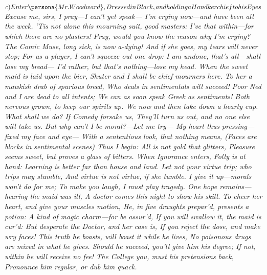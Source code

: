 \documentclass{book}
\begin{document}

\begin{drama}
\begin{versus}
\itshape
\(c)Enter \persona{Mr. Woodward},\\ Dressed in Black, and holding a Handkerchief
to his Eyes\)
\Locus \textus {+4em}
 Excuse me, sirs, I pray---I can't yet speak---
I'm crying now---and have been all the week.
\textup{'Tis not alone this mourning suit,} good masters:
\textup{I've that within}---for which there are no plasters!
Pray, would you know the reason why I'm crying?
The Comic Muse, long sick, is now a-dying!
And if she goes, my tears will never stop;
For as a player, I can't squeeze out one drop:
I am undone, that's all---shall lose my bread---
I'd rather, but that's nothing---lose my head.
When the sweet maid is laid upon the bier,
\textup{Shuter} and I shall be chief mourners here.
To \textup{her} a mawkish drab of spurious breed,
Who deals in \textup{sentimentals} will succeed!
Poor \textup{Ned} and \textup{I} are dead to all intents;
We can as soon speak \textup{Greek} as \textup{sentiments}!
Both nervous grown, to keep our spirits up.
We now and then take down a hearty cup.
What shall we do?  If Comedy forsake us,
\textup{They'll turn us out, and no one else will take us.}
But why can't I be moral?---Let me try---
My heart thus pressing---fixed my face and eye---
With a sententious look, that nothing means,
(Faces are blocks in sentimental scenes)
Thus I begin: \textup{All is not gold that glitters},
{\upshape
Pleasure seems sweet, but proves a glass of bitters.
When Ignorance enters, Folly is at hand:
Learning is better far than house and land.
Let not your virtue trip; who trips may stumble,
And virtue is not virtue, if she tumble.
}
I give it up---morals won't do for me;
To make you laugh, I must play tragedy.
One hope remains---hearing the maid was ill,
A \textup{doctor} comes this night to show his skill.
To cheer her heart, and give your muscles motion,
He, in \textup{five draughts} prepar'd, presents a potion:
A kind of magic charm---for be assur'd,
If you will \textup{swallow it}, the maid is cur'd:
But desperate the Doctor, and her case is,
If you reject the dose, and make wry faces!
This truth he boasts, will boast it while he lives,
No \textup{poisonous drugs} are mixed in what he gives.
Should he succeed, you'll give him his degree;
If not, within he will receive no fee!
The College \textup{you}, must his pretensions back,
Pronounce him \textup{regular}, or dub him \textup{quack}.
\end{versus}
\end{drama}
\end{document}
